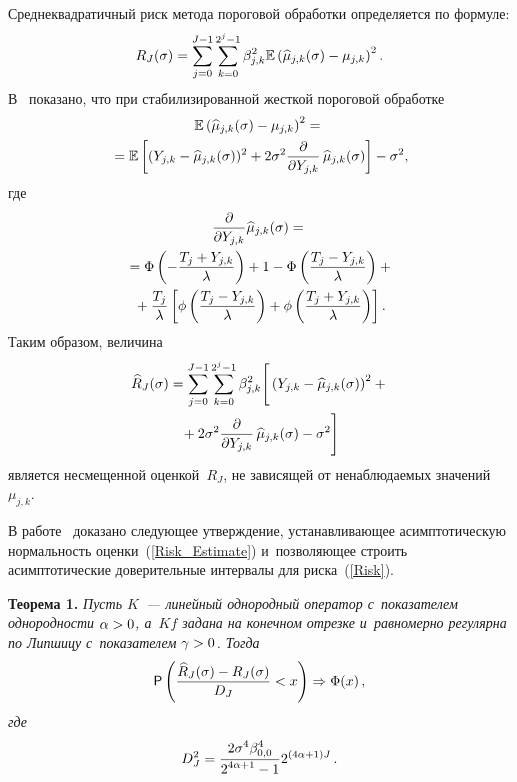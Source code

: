 \begin{multicols}{2}
Среднеквадратичный риск метода пороговой обработки определяется по формуле:
\begin{equation}
\label{Risk}
R_J(\sigma)=\sum\limits_{j=0}^{J-1}\sum\limits_{k=0}^{2^j-1}\beta^2_{j,k}
\mathbb{E}\left(\widehat{\mu}_{j,k}(\sigma)-\mu_{j,k}\right)^2.
\end{equation}
В~\cite{HL10} показано, что при стабилизированной жесткой пороговой обработке
\begin{multline*}
\Expect\left(\widehat{\mu}_{j,k}(\sigma)-\mu_{j,k}\right)^2={}\\
{}=
\Expect\left[(Y_{j,k}-\widehat{\mu}_{j,k}(\sigma))^2+
2\sigma^2\fr{\partial}{\partial Y_{j,k}}\,\widehat{\mu}_{j,k}(\sigma)\right]-
\sigma^2, %
\end{multline*}
где
\begin{multline*}
\fr{\partial}{\partial Y_{j,k}}\widehat{\mu}_{j,k}(\sigma)={}\\
{}=\Phi\left(-\fr{T_j+Y_{j,k}}{\lambda}\right)+1-
\Phi\left(\fr{T_j-Y_{j,k}}{\lambda}\right)+{}\\
{}+
\fr{T_j}{\lambda}\left[\phi\left(\fr{T_j-Y_{j,k}}{\lambda}\right)+
\phi\left(\fr{T_j+Y_{j,k}}{\lambda}\right)\right]. %
\end{multline*}
Таким образом, величина
\begin{multline}
\label{Risk_Estimate}
\widehat{R}_J(\sigma)=\sum\limits_{j=0}^{J-1}\sum\limits_{k=0}^{2^j-1}
\beta^2_{j,k}
\Bigg[
\left(
Y_{j,k}-
\widehat{\mu}_{j,k}(\sigma)\right)^2+{}\\
{}+2\sigma^2\displaystyle\frac{\displaystyle \partial\mathstrut}{\displaystyle \partial Y_{j,k}\mathstrut}\,\widehat{\mu}_{j,k}(\sigma)-
\sigma^2
\Bigg]
\end{multline}
является несмещенной оценкой~$R_J$, не зависящей от ненаблюдаемых значений~$\mu_{j,k}$.

В работе~\cite{SH18} доказано следующее утверждение, устанавливающее 
асимптотическую нормальность оценки~(\ref{Risk_Estimate}) и~позволяющее строить 
асимптотические доверительные интервалы для риска~(\ref{Risk}).

\smallskip

\noindent
\textbf{Теорема 1.} 
\textit{Пусть $K$~--- линейный однородный оператор с~показателем 
однородности $\alpha\hm>0$, а~$Kf$ задана на конечном отрезке и~равномерно 
регулярна по Липшицу с~показателем $\gamma\hm>0$. Тогда}
\begin{equation*}
{\sf P}\left(\fr{\widehat{R}_J(\sigma)-
R_J(\sigma)}{D_J}<x\right)\Rightarrow\Phi(x)\,, %
\end{equation*}
\textit{где}
$$
D^2_J=\displaystyle\frac{\displaystyle 2\sigma^4\beta_{0,0}^4\mathstrut}{\displaystyle 2^{4\alpha+1}-1\mathstrut}2^{(4\alpha+1)J}\,.
$$


\end{multicols}
